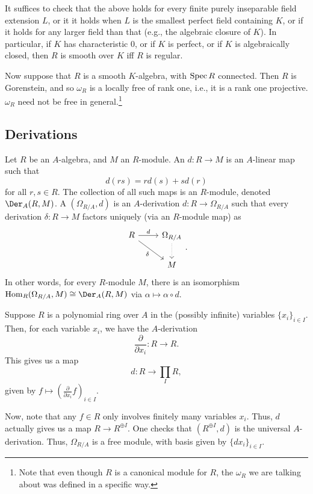 \documentclass[12pt]{article}
\begin{document}
It suffices to check that the above holds for every finite purely inseparable field extension $L$, or it it holds when $L$ is the smallest perfect field containing $K$, or if it holds for any larger field than that (e.g., the algebraic closure of $K$). \newline
In particular, if $K$ has characteristic $0$, or if $K$ is perfect, or if $K$ is algebraically closed, then $R$ is smooth over $K$ iff $R$ is regular.

Now suppose that $R$ is a smooth $K$-algebra, with $\operatorname{Spec} R$ connected. Then $R$ is Gorenstein, and so $\omega_{R}$ is a locally free of rank one, i.e., it is a rank one projective. $\omega_{R}$ need not be free in general.\footnote{Note that even though $R$ is a canonical module for $R$, the $\omega_{R}$ we are talking about was defined in a specific way.} 

\subsection{Derivations}

Let $R$ be an $A$-algebra, and $M$ an $R$-module. An  $d : R \to M$ is an $A$-linear map such that
\begin{equation*} 
	d(rs) = r d(s) + s d(r)
\end{equation*}
for all $r, s \in R$. The collection of all such maps is an $R$-module, denoted $\Der_{A}(R, M)$. \newline
A  $(\Omega_{R/A}, d)$ is an $A$-derivation $d : R \to \Omega_{R/A}$ such that every derivation $\delta : R \to M$ factors uniquely (via an $R$-module map) as
\begin{equation*} 
	\begin{tikzcd}
		R \arrow[r, "d"] \arrow[rd, "\delta"'] & \Omega_{R/A} \arrow[d, dotted] \\
		& M
	\end{tikzcd}.
\end{equation*}
In other words, for every $R$-module $M$, there is an isomorphism $\Hom_{R}(\Omega_{R/A}, M) \cong \Der_{A}(R, M)$ via $\alpha \mapsto \alpha \circ d$.

\begin{ex}
	Suppose $R$ is a polynomial ring over $A$ in the (possibly infinite) variables $\{x_{i}\}_{i \in I}$. Then, for each variable $x_{i}$, we have the $A$-derivation
	\begin{equation*} 
		\dfrac{\partial}{\partial x_{i}} : R \to R.
	\end{equation*}
	This gives us a map
	\begin{equation*} 
		d : R \to \prod_{I} R,
	\end{equation*}
	given by $f \mapsto \left(\frac{\partial}{\partial x_{i}} f\right)_{i \in I}$.

	Now, note that any $f \in R$ only involves finitely many variables $x_{i}$. Thus, $d$ actually gives us a map $R \to R^{\oplus I}$. One checks that $(R^{\oplus I}, d)$ is the universal $A$-derivation. Thus, $\Omega_{R/A}$ is a free module, with basis given by $\{d x_{i}\}_{i \in I}$.
\end{ex}
\end{document}
